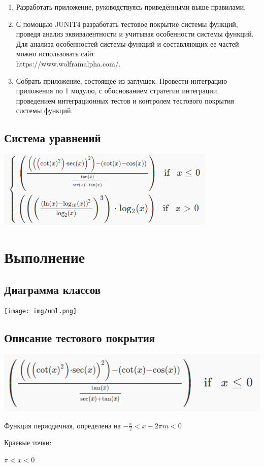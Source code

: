 \begin{enumerate}
\item Разработать приложение, руководствуясь приведёнными выше правилами.
\item С помощью JUNIT4 разработать тестовое покрытие системы функций,
проведя анализ эквивалентности и учитывая особенности системы функций.
Для анализа особенностей системы функций и составляющих ее частей можно
использовать сайт \\ https://www.wolframalpha.com/.
\item Собрать приложение, состоящее из заглушек.  Провести интеграцию приложения
по 1 модулю, с обоснованием стратегии интеграции, проведением интеграционных
тестов и контролем тестового покрытия системы функций.
\end{enumerate}
\subsection{Система уравнений}
\includegraphics[width=300bp]{img/system.png}
\section{Выполнение}
\subsection{Диаграмма классов}
\texttt{[image: img/uml.png]}
\subsection{Описание тестового покрытия}
\includegraphics[width=300bp]{img/first.png}

Функция периодичная, определена на $-\frac{\pi}{2} < x - 2\pi m < 0$

Краевые точки:

$\pi < x < 0$

